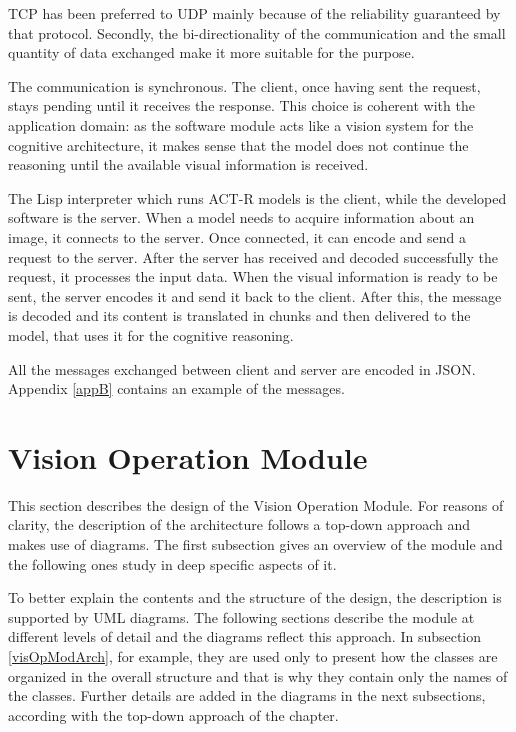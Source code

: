 	TCP has been preferred to \mbox{UDP} mainly because of the reliability guaranteed by that protocol. 
	Secondly, the bi-directionality of the communication and the small quantity of data exchanged make it more suitable for the purpose.

	The communication is synchronous. 
	The client, once having sent the request, stays pending until it receives the response. 
	This choice is coherent with the application domain: as the software module acts like a vision system for the cognitive architecture, it makes sense that the model does not continue the reasoning until the available visual information is received.

	The \mbox{Lisp} interpreter which runs \mbox{ACT-R} models is the client, while the developed software is the server.  	
	When a model needs to acquire information about an image, it connects to the server. 
	Once connected, it can encode and send a request to the server. 
	After the server has received and decoded successfully the request, it processes the input data. 
	When the visual information is ready to be sent, the server encodes it and send it back to the client. 
	After this, the message is decoded and its content is translated in chunks and then delivered to the model, that uses it for the cognitive reasoning.

	All the messages exchanged between client and server are encoded in \mbox{JSON}. 
	Appendix \ref{appB} contains an example of the messages.


	\section{Vision Operation Module}
	This section describes the design of the Vision Operation Module.
	For reasons of clarity, the description of the architecture follows a top-down approach and makes use of diagrams. 		The first subsection gives an overview of the module and the following ones study in deep specific aspects of it.

	To better explain the contents and the structure of the design, the description is supported by \mbox{UML} diagrams. 
	The following sections describe the module at different levels of detail and the diagrams reflect this approach.
	In subsection \ref{visOpModArch}, for example, they are used only to present how the classes are organized in the overall structure and that is why they contain only the names of the classes. 
	Further details are added in the diagrams in the next subsections, according with the top-down approach of the chapter.
	
